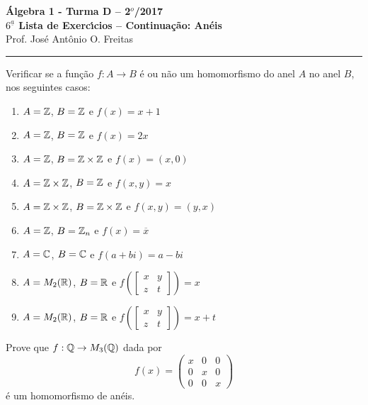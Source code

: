 \documentclass[12pt]{article}
\begin{document}


\begin{center}
 {\Large\bf {\'A}lgebra 1 - Turma D -- 2$^{o}$/2017} \\
 \vspace{9pt} {\large\bf $6^{\underline{a}}$ Lista de Exerc{\'\i}cios -- Continuação: An\'eis}\\
 \vspace{9pt} Prof. Jos{\'e} Ant{\^o}nio O. Freitas
\end{center}
\hrule

\vspace{.6cm}

\questao Verificar se a função $f : A \to B$ é ou não um homomorfismo do anel $A$ no anel $B$, nos seguintes casos:
\begin{enumerate}[label=({\alph*})]
\item $A = \mathbb{Z}$, $B = \mathbb{Z}$ e $f(x) = x + 1$
\item $A = \mathbb{Z}$, $B = \mathbb{Z}$ e $f(x) = 2x$
\item $A = \mathbb{Z}$, $B = \mathbb{Z} \times \mathbb{Z}$ e $f(x) = (x, 0)$
\item $A = \mathbb{Z} \times \mathbb{Z}$, $B = \mathbb{Z}$ e $f(x,y) = x$
\item $A = \mathbb{Z} \times \mathbb{Z}$, $B = \mathbb{Z} \times \mathbb{Z}$ e $f(x,y) = (y,x)$
\item $A = \mathbb{Z}$, $B = \mathbb{Z}_n$ e $f(x) = \overline{x}$
\item $A = \mathbb{C}$, $B = \mathbb{C}$ e $f(a + bi) = a - bi$
\item $A = M_2(\mathbb{R})$, $B = \mathbb{R}$ e $f\left(\begin{bmatrix}
	x & y\\z & t
\end{bmatrix}\right) = x$
\item $A = M_2(\mathbb{R})$, $B = \mathbb{R}$ e $f\left(\begin{bmatrix}
	x & y\\z & t
\end{bmatrix}\right) = x + t$
\end{enumerate}

\vesp

\questao Prove que $f : \mathbb{Q} \to M_3(\mathbb{Q})$ dada por
\[
	f(x) = \begin{pmatrix}
		x & 0 & 0\\
		0 & x & 0\\
		0 & 0 & x
	\end{pmatrix}
\]
é um homomorfismo de anéis.

\vesp
\end{document}
